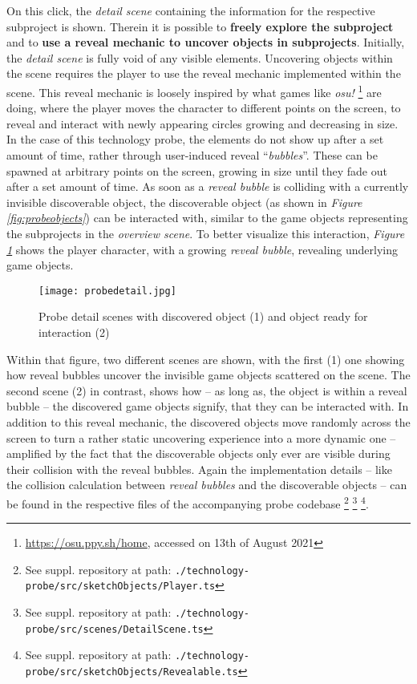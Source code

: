 On this click, the \textit{detail scene} containing the information for the respective subproject is shown. Therein it is possible to \textbf{freely explore the subproject} and to \textbf{use a reveal mechanic to uncover objects in subprojects}. Initially, the \textit{detail scene} is fully void of any visible elements. Uncovering objects within the scene requires the player to use the reveal mechanic implemented within the scene. This reveal mechanic is loosely inspired by what games like \textit{osu!} \footnote{\url{https://osu.ppy.sh/home}, accessed on 13th of August 2021} are doing, where the player moves the character to different points on the screen, to reveal and interact with newly appearing circles growing and decreasing in size. In the case of this technology probe, the elements do not show up after a set amount of time, rather through user-induced reveal \enquote{\textit{bubbles}}. These can be spawned at arbitrary points on the screen, growing in size until they fade out after a set amount of time. As soon as a \textit{reveal bubble} is colliding with a currently invisible discoverable object, the discoverable object (as shown in \textit{Figure \ref{fig:probeobjects}}) can be interacted with, similar to the game objects representing the subprojects in the \textit{overview scene}. To better visualize this interaction, \textit{Figure \ref{fig:probedetail}} shows the player character, with a growing \textit{reveal bubble}, revealing underlying game objects.

\begin{figure}[h]
  \centering
  \texttt{[image: probedetail.jpg]}
  \caption{Probe detail scenes with discovered object (1) and object ready for interaction (2)}
  \label{fig:probedetail}
\end{figure}

Within that figure, two different scenes are shown, with the first (1) one showing how reveal bubbles uncover the invisible game objects scattered on the scene. The second scene (2) in contrast, shows how -- as long as, the object is within a reveal bubble -- the discovered game objects signify, that they can be interacted with. In addition to this reveal mechanic, the discovered objects move randomly across the screen to turn a rather static uncovering experience into a more dynamic one -- amplified by the fact that the discoverable objects only ever are visible during their collision with the reveal bubbles. Again the implementation details -- like the collision calculation between \textit{reveal bubbles} and the discoverable objects -- can be found in the respective files of the accompanying probe codebase \footnote{See suppl. repository at path: \texttt{./technology-probe/src/sketchObjects/Player.ts}} \footnote{See suppl. repository at path: \texttt{./technology-probe/src/scenes/DetailScene.ts}} \footnote{See suppl. repository at path: \texttt{./technology-probe/src/sketchObjects/Revealable.ts}}.

